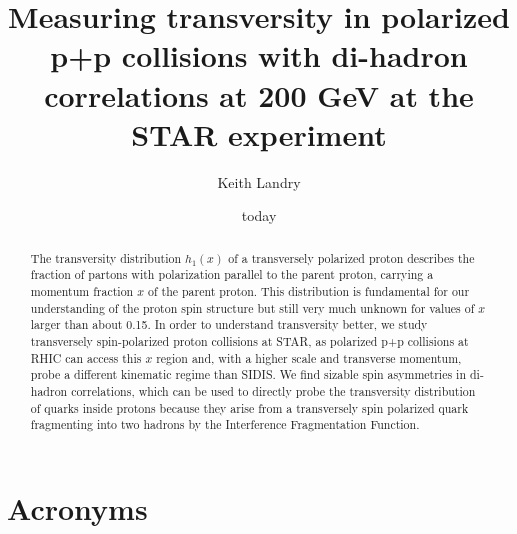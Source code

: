 \documentclass[abstract = on,listof=totoc, bibliography=totoc]{scrreprt}
\begin{document}
\title{Measuring transversity in polarized p+p collisions with di-hadron correlations at  200 GeV at the STAR experiment}
\author{Keith Landry}
\date{today}
\maketitle

\begin{abstract}
The transversity distribution $h_1(x)$ of a transversely polarized proton describes the fraction of partons with polarization parallel to the parent proton, carrying a momentum fraction $x$ of the parent proton. This distribution is fundamental for our understanding of the proton spin structure but still very much unknown for values of $x$ larger than about 0.15. In order to understand transversity better, we study transversely spin-polarized proton collisions at STAR, as polarized p+p collisions at RHIC can access this $x$ region and, with a higher scale and transverse momentum,  probe a different kinematic regime than SIDIS. We find sizable spin asymmetries in di-hadron correlations, which can be used to directly probe the transversity distribution of quarks inside protons because they arise from a transversely spin polarized quark fragmenting into two hadrons by the Interference Fragmentation Function. 
\end{abstract}

\tableofcontents
\listoffigures
\listoftables


\chapter*{Acronyms}
 
\end{document}
